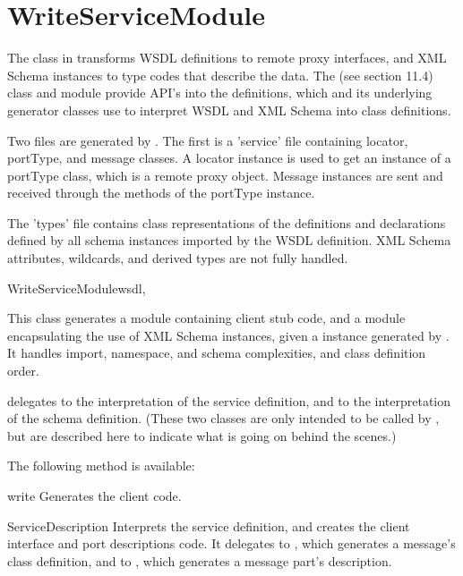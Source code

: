 \section{WriteServiceModule}

The  class in 
transforms WSDL definitions
to remote proxy interfaces, and XML Schema instances to type codes that describe
the data.  The  (see section 11.4) class and
module provide API's into the
definitions, which  and its underlying generator classes
use to interpret WSDL and XML Schema into class definitions.

Two files are generated by .  The first is a
'service' file containing locator, portType, and message classes.  
A locator instance is used to
get an instance of a portType class, which is a remote proxy object.
Message instances are sent and received through the methods of the
portType instance.

The 'types' file contains class representations of the definitions and
declarations defined by all schema instances imported by the WSDL definition.
XML Schema attributes, wildcards, and derived types are not fully
handled.

\begin{classdesc}{WriteServiceModule}{wsdl, }

This class generates a module containing client stub code, and a module
encapsulating the use of XML Schema instances, given a 
instance generated by .
It handles import, namespace, and schema complexities, and class definition
order.

 delegates to  the
interpretation
of the service definition, and to  the interpretation
of the schema definition.  (These two classes are only intended to be called
by , but are described here to indicate what
is going on behind the scenes.)

The following method is available:

\begin{methoddesc}{write}{}
Generates the client code.
\end{methoddesc}

\end{classdesc}

\begin{classdesc}{ServiceDescription}{}
Interprets the service definition, and creates the client interface and
port descriptions code.  It delegates to , which
generates a message's class definition, and to , which
generates a message part's description.
\end{classdesc}

